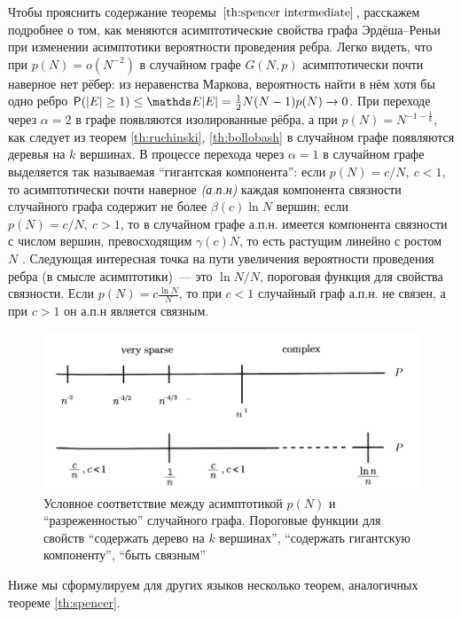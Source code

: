 Чтобы прояснить содержание теоремы $\ref{th:spencer intermediate}$, расскажем подробнее о том, как меняются  асимптотические свойства графа Эрдёша--Реньи при изменении асимптотики вероятности проведения ребра.
Легко видеть, что при $p(N) = o(N^{-2})$ в случайном графе $G(N,p)$ асимптотически почти наверное нет рёбер: из неравенства Маркова, вероятность найти в нём хотя бы одно ребро $\P(|E| \geq 1) \leq \E |E| = \frac{1}{2} N(N-1)p(N) \rightarrow 0$.
При переходе через $\alpha = 2$ в графе появляются изолированные рёбра, а при $p(N) = N^{-1 - \frac{1}{k}}$, как следует из теорем \ref{th:ruchinski}, \ref{th:bollobash} в случайном графе появляются деревья на $k$ вершинах.
В процессе перехода через $\alpha = 1$ в случайном графе выделяется так называемая ``гигантская компонента'': если $p(N)=c/N,~ c < 1$, то асимптотически почти наверное \textit{(а.п.н)} каждая компонента связности случайного графа содержит не более $\beta (c) \ln{N} $ вершин;
если $p(N)=c/N,~ c > 1$, то в случайном графе а.п.н. имеется компонента связности с числом вершин, превосходящим $\gamma(c)N$, то есть растущим линейно с ростом $N$\cite{erdos1959random} \cite{erdos1960evolution} \cite{raigor2010models}.
Следующая интересная точка на пути увеличения вероятности проведения ребра (в смысле асимптотики)~--- это $\ln{N}/N$, пороговая функция для свойства связности.
Если $p(N) = c \frac{\ln{N}}{N}$, то при $c < 1$ случайный граф а.п.н. не связен, а при $c > 1$ он а.п.н является связным\cite{raigor2010models}.
\begin{figure}
  \centering
  \includegraphics[scale=0.5]{picrel/density.png}
  \caption{Условное соответствие между асимптотикой $p(N)$ и ``разреженностью'' случайного графа. Пороговые функции для свойств ``содержать дерево на $k$ вершинах'', ``содержать гигантскую компоненту'', ``быть связным''}
  \label{fig:density}
\end{figure}

Ниже мы сформулируем для других языков несколько теорем, аналогичных теореме \ref{th:spencer}.

